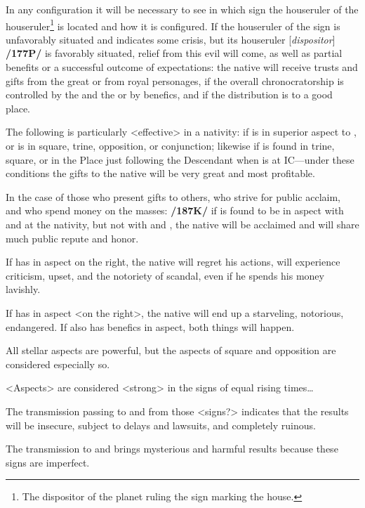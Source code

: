 In any configuration it will be necessary to see in which sign the houseruler of the houseruler\footnote{The dispositor of the planet ruling the sign marking the house.} is located and how it is configured. If the houseruler of the sign is unfavorably situated and indicates some crisis, but its houseruler [\textit{dispositor}] \textbf{/177P/} is favorably situated, relief from this evil will come, as well as partial benefits or a successful outcome of expectations: the native will receive trusts and gifts from the great or from royal personages, if the overall chronocratorship is controlled by the \Sun\xspace and the \Moon\xspace or by benefics, and if the distribution is to a good place. 


The following is particularly <effective> in a nativity: if \Jupiter\xspace is in superior aspect to \Saturn, or is in square, trine, opposition, or conjunction; likewise if \Mars\xspace is found in trine, square, or in the Place just following the Descendant when \Jupiter\xspace is at IC—under these conditions the gifts to the native will be very great and most profitable. 

In the case of those who present gifts to others, who strive for public acclaim, and who spend money on the masses: \textbf{/187K/} if \Mercury\xspace is found to be in aspect with \Jupiter\xspace and \Venus\xspace at the nativity, but not with \Saturn\xspace and \Mars, the native will be acclaimed and will share much public repute and honor. 

If \Mercury\xspace has \Mars\xspace in aspect on the right, the
native will regret his actions, will experience criticism, upset, and the notoriety of scandal, even if he spends his money lavishly. 

If \Mercury\xspace has \Saturn\xspace in aspect <on the right>, the native will end up a starveling, notorious, endangered. If \Mercury\xspace also has benefics in aspect, both things will happen.

All  stellar aspects are powerful, but the aspects of square and opposition are considered especially so.

<Aspects> are considered <strong> in the signs of equal rising times\ldots

The transmission passing to \Taurus\xspace and \Virgo\xspace from those <signs?> indicates that the results will be
insecure, subject to delays and lawsuits, and completely ruinous. 

The transmission to \Sagittarius\xspace and \Capricorn\xspace brings mysterious and harmful results because these signs are imperfect.


